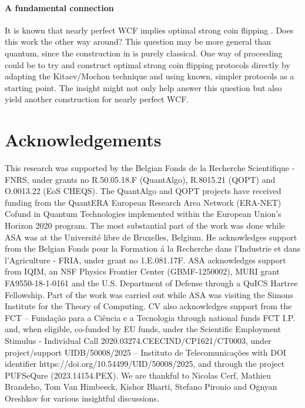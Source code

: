 \documentclass{theoretics}
\begin{document}
\paragraph{A fundamental connection} It is known that nearly perfect
WCF implies optimal strong coin flipping \cite{CK09}. Does this work the other way around?
This question may be more general than quantum, since the construction
in \cite{CK09} is purely classical. One way of proceeding could be
to try and construct optimal strong coin flipping protocols directly by adapting the Kitaev/Mochon
technique and using known, simpler protocols as a starting point.
The insight might not only help answer this question but also
yield another construction for nearly perfect WCF.











\section*{Acknowledgements}
This research was supported by the Belgian
Fonds de la Recherche Scientifique - FNRS, under grants
no R.50.05.18.F (QuantAlgo), R.8015.21 (QOPT) and O.0013.22 (EoS CHEQS). The QuantAlgo and QOPT projects have received funding from the QuantERA European Research Area Network (ERA-NET) Cofund in Quantum Technologies implemented within the European Union's Horizon 2020 program.
The most substantial part of the work was done while ASA was at the Universit{\' e} libre de Bruxelles, Belgium. He acknowledges support from the Belgian Fonds pour la Formation {\' a} la Recherche dans l'Industrie et dans l'Agriculture - FRIA, under grant no 1.E.081.17F. ASA acknowledges support from IQIM, an NSF Physics Frontier Center (GBMF-1250002), MURI grant FA9550-18-1-0161 and the U.S. Department of Defense through a QuICS Hartree Fellowship. Part of the work was carried out while ASA was visiting the Simons Institute for the Theory of Computing.
%
CV also acknowledges support from the FCT -- Funda\c c\~ao para a Ci\^encia e a Tecnologia through national funds FCT I.P. and, when eligible, co-funded by EU funds, under the
Scientific Employment Stimulus - Individual Call 2020.03274.CEECIND/CP1621/CT0003, under
project/support UIDB/50008/2025 -- Instituto de Telecomunicações with DOI identifier https://doi.org/10.54499/UID/50008/2025, and through the project PUFSeQure (2023.14154.PEX).
We are thankful to Nicolas Cerf, Mathieu Brandeho, Tom Van Himbeeck, Kishor Bharti, Stefano Pironio and Ognyan Oreshkov for various insightful discussions.
\end{document}
